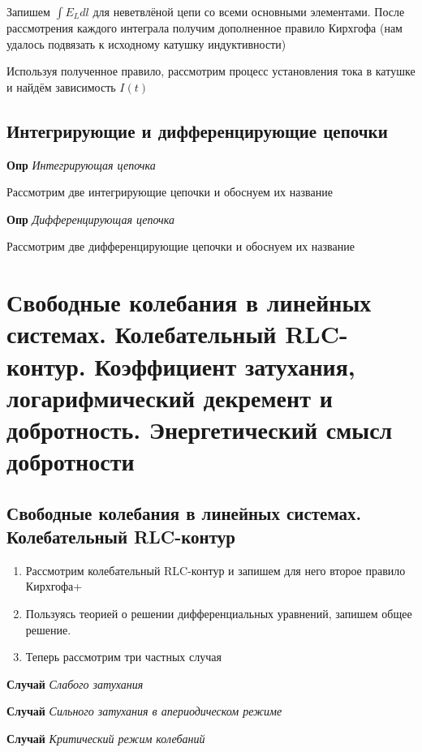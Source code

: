 \documentclass[a4paper, 14pt]{article}
\begin{document}
    Запишем $\int E_L dl$ для неветвлёной цепи со всеми основными элементами.
    После рассмотрения каждого интеграла получим дополненное правило Кирхгофа (нам удалось подвязать к исходному
    катушку индуктивности)
    
    Используя полученное правило, рассмотрим процесс установления тока в катушке и найдём зависимость $I(t)$
    
    \subsection{Интегрирующие и дифференцирующие цепочки}
    
    \textbf{Опр} \textit{Интегрирующая цепочка}
    
    Рассмотрим две интегрирующие цепочки и обоснуем их название
    
    \textbf{Опр} \textit{Дифференцирующая цепочка}
    
    Рассмотрим две дифференцирующие цепочки и обоснуем их название
    
    \section{Свободные колебания в линейных системах. Колебательный RLC-контур.
    Коэффициент затухания, логарифмический декремент и добротность.
    Энергетический смысл добротности}
    
    \subsection{Свободные колебания в линейных системах. Колебательный RLC-контур}
    
    \begin{enumerate}
        \item Рассмотрим колебательный RLC-контур и запишем для него второе правило Кирхгофа+
        \item Пользуясь теорией о решении дифференциальных уравнений, запишем общее решение.
        \item Теперь рассмотрим три частных случая
    \end{enumerate}
    
    \textbf{Случай} \textit{Слабого затухания}
    
    \textbf{Случай} \textit{Сильного затухания в апериодическом режиме}
    
    \textbf{Случай} \textit{Критический режим колебаний}
    
\end{document}
